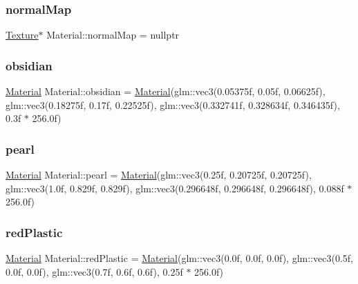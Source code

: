 \subsubsection{\texorpdfstring{normalMap}{normalMap}}
{\footnotesize\ttfamily \mbox{\hyperlink{class_texture}{Texture}}$\ast$ Material\+::normal\+Map = nullptr}

\mbox{\label{struct_material_aa189bbbd916aaf6a451296e2ffc6a47c}} 
\subsubsection{\texorpdfstring{obsidian}{obsidian}}
{\footnotesize\ttfamily \mbox{\hyperlink{struct_material}{Material}} Material\+::obsidian = \mbox{\hyperlink{struct_material}{Material}}(glm\+::vec3(0.\+05375f, 0.\+05f, 0.\+06625f), glm\+::vec3(0.\+18275f, 0.\+17f, 0.\+22525f), glm\+::vec3(0.\+332741f, 0.\+328634f, 0.\+346435f), 0.\+3f $\ast$ 256.\+0f)\hspace{0.3cm}{\ttfamily [static]}}

\mbox{\label{struct_material_af1eb6afe67d69a7992ac7bfd31c76173}} 
\subsubsection{\texorpdfstring{pearl}{pearl}}
{\footnotesize\ttfamily \mbox{\hyperlink{struct_material}{Material}} Material\+::pearl = \mbox{\hyperlink{struct_material}{Material}}(glm\+::vec3(0.\+25f, 0.\+20725f, 0.\+20725f), glm\+::vec3(1.\+0f, 0.\+829f, 0.\+829f), glm\+::vec3(0.\+296648f, 0.\+296648f, 0.\+296648f), 0.\+088f $\ast$ 256.\+0f)\hspace{0.3cm}{\ttfamily [static]}}

\mbox{\label{struct_material_a343f9c5d998f1db5ba50ef40376b09fe}} 
\subsubsection{\texorpdfstring{redPlastic}{redPlastic}}
{\footnotesize\ttfamily \mbox{\hyperlink{struct_material}{Material}} Material\+::red\+Plastic = \mbox{\hyperlink{struct_material}{Material}}(glm\+::vec3(0.\+0f, 0.\+0f, 0.\+0f), glm\+::vec3(0.\+5f, 0.\+0f, 0.\+0f), glm\+::vec3(0.\+7f, 0.\+6f, 0.\+6f), 0.\+25f $\ast$ 256.\+0f)\hspace{0.3cm}{\ttfamily [static]}}

